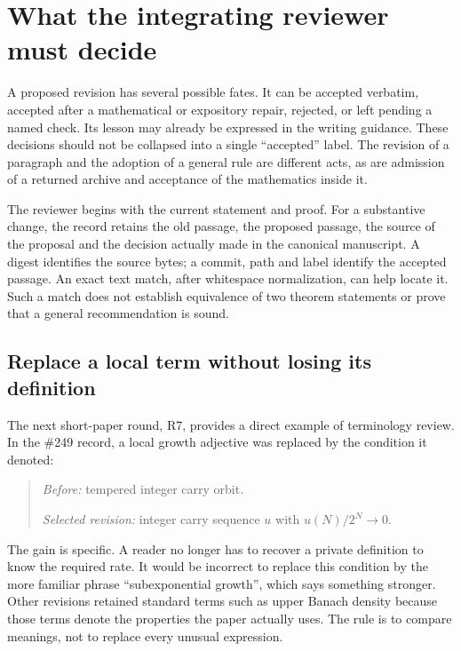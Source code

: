 \section{What the integrating reviewer must decide}\label{sec:review}

A proposed revision has several possible fates. It can be accepted verbatim,
accepted after a mathematical or expository repair, rejected, or left pending
a named check. Its lesson may already be expressed in the writing guidance.
These decisions should not be collapsed into a single ``accepted'' label.
The revision of a paragraph and the adoption of a general rule are different
acts, as are admission of a returned archive and acceptance of the mathematics
inside it.

The reviewer begins with the current statement and proof. For a substantive
change, the record retains the old passage, the proposed passage, the source
of the proposal and the decision actually made in the canonical manuscript.
A digest identifies the source bytes; a commit, path and label identify the
accepted passage. An exact text match, after whitespace normalization, can
help locate it. Such a match does not establish equivalence of two theorem
statements or prove that a general recommendation is sound.

\subsection{Replace a local term without losing its definition}

The next short-paper round, R7, provides a direct example of terminology
review. In the \#249 record, a local growth adjective was replaced by the
condition it denoted:
\begin{quote}
\emph{Before:} tempered integer carry orbit.\par
\emph{Selected revision:} integer carry sequence $u$ with
$u(N)/2^N\to0$.
\end{quote}
The gain is specific. A reader no longer has to recover a private definition
to know the required rate. It would be incorrect to replace this condition by
the more familiar phrase ``subexponential growth'', which says something
stronger. Other revisions retained standard terms such as upper Banach
density because those terms denote the properties the paper actually uses.
The rule is to compare meanings, not to replace every unusual expression.

